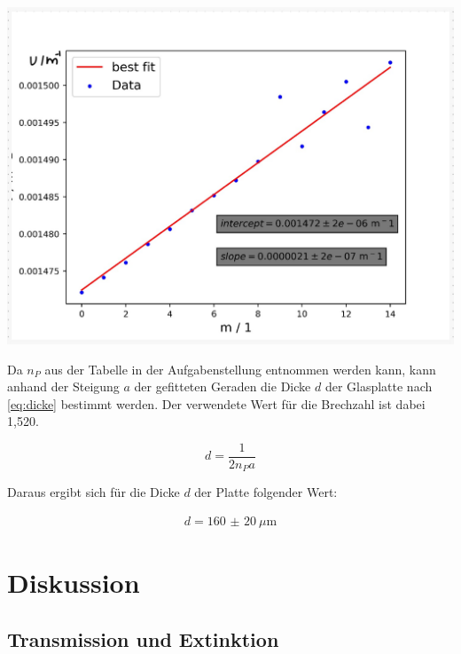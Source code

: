 \documentclass[11pt,ngerman]{scrartcl}
\begin{document}
\begin{center}
	\begin{minipage}{0.65\textwidth}
		\includegraphics[width=\textwidth]{reg}
		\label{fig:steigung}
	\end{minipage}
\end{center}

\newpage

\noindent Da $n_P$ aus der Tabelle in der Aufgabenstellung entnommen werden kann, kann anhand der Steigung $a$ der gefitteten Geraden die Dicke $d$ der Glasplatte nach \autoref{eq:dicke} bestimmt werden. Der verwendete Wert für die Brechzahl ist dabei 1,520.

\begin{equation}
	d = \frac{1}{2n_P a}
	\label{eq:dicke}
\end{equation}

\noindent Daraus ergibt sich für die Dicke $d$ der Platte folgender Wert:

\begin{align*}
	d = \SI{160(20)}{\mu \meter}
\end{align*}

\section{Diskussion}\label{disk}

\subsection{Transmission und Extinktion}
\end{document}
